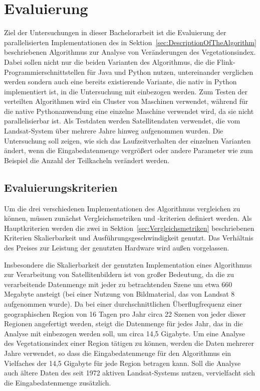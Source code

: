 \chapter{Evaluierung}
Ziel der Untersuchungen in dieser Bachelorarbeit ist die Evaluierung der parallelisierten Implementationen des in Sektion~\ref{sec:DescriptionOfTheAlgorithm} beschriebenen Algorithmus zur Analyse von Veränderungen des Vegetationsindex. Dabei sollen nicht nur die beiden Varianten des Algorithmus, die die Flink-Programmierschnittstellen für Java und Python nutzen, untereinander verglichen werden sondern auch eine bereits existierende Variante, die nativ in Python implementiert ist, in die Untersuchung mit einbezogen werden. Zum Testen der verteilten Algorithmen wird ein Cluster von Maschinen verwendet, während für die native Pythonanwendung eine einzelne Maschine verwendet wird, da sie nicht parallelisierbar ist. Als Testdaten werden Satellitendaten verwendet, die vom Landsat-System über mehrere Jahre hinweg aufgenommen wurden. Die Untersuchung soll zeigen, wie sich das Laufzeitverhalten der einzelnen Varianten ändert, wenn die Eingabedatenmenge vergrößert oder andere Parameter wie zum Beispiel die Anzahl der Teilkacheln verändert werden.

\section{Evaluierungskriterien}
\label{sec:evaluationCriteria}
Um die drei verschiedenen Implementationen des Algorithmus vergleichen zu können, müssen zunächst Vergleichsmetriken und -kriterien definiert werden. Als Hauptkriterien werden die zwei in Sektion~\ref{sec:Vergleichsmetriken} beschriebenen Kriterien Skalierbarkeit und Ausführungsgeschwindigkeit genutzt. Das Verhältnis des Preises zur Leistung der genutzten Hardware wird außen vorgelassen. 

Insbesondere die Skalierbarkeit der genutzten Implementation eines Algorithmus zur Verarbeitung von Satellitenbildern ist von großer Bedeutung, da die zu verarbeitende Datenmenge mit jeder zu betrachtenden Szene um etwa 660 Megabyte ansteigt (bei einer Nutzung von Bildmaterial, das von Landsat 8 aufgenommen wurde). Da bei einer durchschnittlichen Überflugfrequenz einer geographischen Region von 16 Tagen pro Jahr circa 22 Szenen von jeder dieser Regionen angefertigt werden, steigt die Datenmenge für jedes Jahr, das in die Analyse mit einbezogen werden soll, um circa 14,5 Gigabyte. Um eine Analyse des Vegetationsindex einer Region tätigen zu können, werden die Daten mehrerer Jahre verwendet, so dass die Eingabedatenmenge für den Algorithmus ein Vielfaches der 14,5 Gigabyte für jede Region betragen kann. Soll die Analyse auch ältere Daten des seit 1972 aktiven Landsat-Systems nutzen, vervielfacht sich die Eingabedatenmenge zusätzlich.

